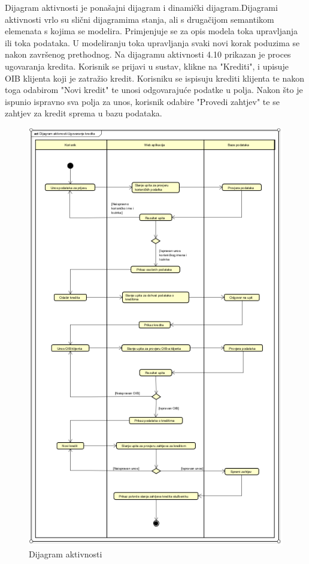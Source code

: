 		Dijagram aktivnosti je ponašajni dijagram i dinamički dijagram.Dijagrami aktivnosti vrlo su slični dijagramima stanja, ali s drugačijom
		semantikom elemenata s kojima se modelira. Primjenjuje se za opis modela toka upravljanja ili toka podataka. U modeliranju toka upravljanja svaki novi korak poduzima se nakon završenog prethodnog. Na dijagramu aktivnosti 4.10 prikazan je proces ugovaranja kredita. Korisnik se prijavi u sustav, klikne na "Krediti", i upisuje OIB klijenta koji je zatražio kredit. Korisniku se ispisuju krediti klijenta te nakon toga odabirom "Novi kredit" te unosi odgovarajuće podatke u polja. Nakon što je ispunio ispravno sva polja za unos, korisnik odabire "Provedi zahtjev" te se zahtjev za kredit sprema u bazu podataka.
		
			\begin{figure}[H]
			\includegraphics[scale=0.8]{Slike/dijagramAktivnosti.PNG}
			\centering
			\caption{Dijagram aktivnosti}
			\label{fig:dijagram}
		\end{figure}
	
